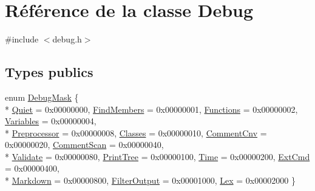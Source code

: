 \hypertarget{class_debug}{}\section{Référence de la classe Debug}
\label{class_debug}


{\ttfamily \#include $<$debug.\+h$>$}

\subsection*{Types publics}
\begin{DoxyCompactItemize}
\item 
enum \hyperlink{class_debug_a9e0b892a8030a4f64076850777991c96}{Debug\+Mask} \{ \\*
\hyperlink{class_debug_a9e0b892a8030a4f64076850777991c96aa1079d9a4345660aa3e283c322fd12f3}{Quiet} = 0x00000000, 
\hyperlink{class_debug_a9e0b892a8030a4f64076850777991c96ac4d3bb469126ba5f5ba50c724219edf5}{Find\+Members} = 0x00000001, 
\hyperlink{class_debug_a9e0b892a8030a4f64076850777991c96a6988d421a5b346541cb4f804054562a4}{Functions} = 0x00000002, 
\hyperlink{class_debug_a9e0b892a8030a4f64076850777991c96a442859fe9afb29937aeeac886b911f64}{Variables} = 0x00000004, 
\\*
\hyperlink{class_debug_a9e0b892a8030a4f64076850777991c96aec63880706f2286cd7ca9057bf407e2f}{Preprocessor} = 0x00000008, 
\hyperlink{class_debug_a9e0b892a8030a4f64076850777991c96ae45530210daeb78c35e1b4c078277c8f}{Classes} = 0x00000010, 
\hyperlink{class_debug_a9e0b892a8030a4f64076850777991c96af158610d0a0e6dd08ec7cab215168fa5}{Comment\+Cnv} = 0x00000020, 
\hyperlink{class_debug_a9e0b892a8030a4f64076850777991c96afeb3ede15e44e56c363351c25efd2504}{Comment\+Scan} = 0x00000040, 
\\*
\hyperlink{class_debug_a9e0b892a8030a4f64076850777991c96ab57325adbf79149e4bd7a010d6e83499}{Validate} = 0x00000080, 
\hyperlink{class_debug_a9e0b892a8030a4f64076850777991c96a92b8cea26e6d5e2a5d3d04b63686bb2b}{Print\+Tree} = 0x00000100, 
\hyperlink{class_debug_a9e0b892a8030a4f64076850777991c96a9cbd5d3516ffd3fe86238779edb2f7c5}{Time} = 0x00000200, 
\hyperlink{class_debug_a9e0b892a8030a4f64076850777991c96a8dbe64e9ab683833c1ea7252649058a3}{Ext\+Cmd} = 0x00000400, 
\\*
\hyperlink{class_debug_a9e0b892a8030a4f64076850777991c96a4e7a964cec1d0423c74ab7045c1f6f6d}{Markdown} = 0x00000800, 
\hyperlink{class_debug_a9e0b892a8030a4f64076850777991c96a5e47cf9df9552fe30480288b70288d72}{Filter\+Output} = 0x00001000, 
\hyperlink{class_debug_a9e0b892a8030a4f64076850777991c96a0c1d42bd6b09e5427669a49f082e823b}{Lex} = 0x00002000
 \}
\end{DoxyCompactItemize}
